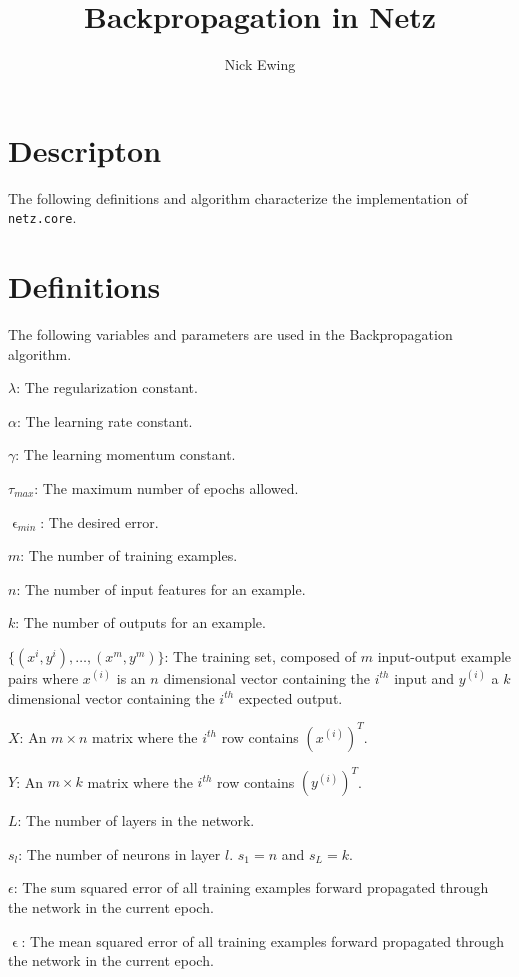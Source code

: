 \documentclass[12pt,notitlepage]{report}
\title{Backpropagation in Netz}
\author{Nick Ewing}
\date{}
\begin{document}
  \maketitle

  \section{Descripton}

  The following definitions and algorithm characterize the implementation of
  {\tt netz.core}.

  \section{Definitions}

  The following variables and parameters are used in the Backpropagation
  algorithm.

  $\lambda$: The regularization constant.

  $\alpha$: The learning rate constant.

  $\gamma$: The learning momentum constant.

  $\tau_{max}$: The maximum number of epochs allowed.

  $\upvarepsilon_{min}$: The desired error.

  $m$: The number of training examples.

  $n$: The number of input features for an example.

  $k$: The number of outputs for an example.

  $\{(x^{i}, y^{i}), \dots, (x^{m}, y^{m})\}$: The training set, composed of $m$
  input-output example pairs where $x^{(i)}$ is an $n$ dimensional vector
  containing the $i^{th}$ input and $y^{(i)}$ a $k$ dimensional vector
  containing the $i^{th}$ expected output.

  $X$: An $m \times n$ matrix where the $i^{th}$ row contains $(x^{(i)})^{T}$.

  $Y$: An $m \times k$ matrix where the $i^{th}$ row contains $(y^{(i)})^{T}$.

  $L$: The number of layers in the network.

  $s_{l}$: The number of neurons in layer $l$.  $s_{1} = n$ and $s_{L} = k$.

  $\epsilon$: The sum squared error of all training examples forward propagated
  through the network in the current epoch.

  $\upvarepsilon$: The mean squared error of all training examples forward
  propagated through the network in the current epoch.
\end{document}
